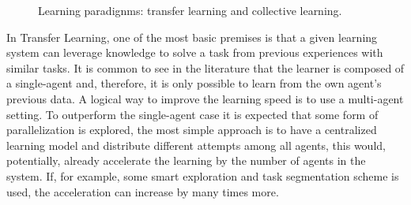 \begin{figure}[ht!]
	\centering
	\hspace*{\fill}
	\hfill
	\hspace*{\fill}
	\caption[] {\label{fig:learning_paradigms} Learning paradignms:  transfer learning and  collective learning. }
\end{figure}
In Transfer Learning, one of the most basic premises is that a given learning system can leverage knowledge to solve a task from previous experiences with similar tasks. It is common to see in the literature that the learner is composed of a single-agent and, therefore, it is only possible to learn from the own agent's previous data. A logical way to improve the learning speed is to use a multi-agent setting. To outperform the single-agent case it is expected that some form of parallelization is explored, the most simple approach is to have a centralized learning model and distribute different attempts among all agents, this would, potentially, already accelerate the learning by the number of agents in the system. If, for example, some smart exploration and task segmentation scheme is used, the acceleration can increase by many times more. 

